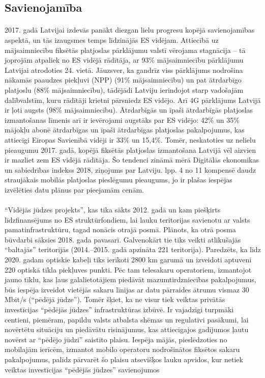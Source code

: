 \subsection{Savienojamība}
\paragraph{}
2017. gadā Latvijai izdevās panākt diezgan lielu progresu kopējā savienojamības
aspektā, un tās izaugsmes temps līdzinājās ES vidējam. Attiecībā uz mājsaimniecību
fiksētās platjoslas pārklājumu valstī vērojama stagnācija – tā joprojām atpaliek no ES
vidējā rādītāja, ar 93\% mājsaimniecību pārklājumu Latvijai atrodoties 24. vietā.
Jāuzsver, ka gandrīz viss pārklājums nodrošina nākamās paaudzes piekļuvi (NPP)
(91\% mājsaimniecību) un pat ātrdarbīgo platjoslu (88\% mājsaimniecību), tādējādi
Latviju ierindojot starp vadošajām dalībvalstīm, kuru rādītāji krietni pārsniedz ES
vidējo. Arī 4G pārklājums Latvijā ir ļoti augsts (98\% mājsaimniecību). Ātrdarbīgās un
īpaši ātrdarbīgās platjoslas izmantošanas līmenis arī ir ievērojami augstāks par ES
vidējo: 42\% un 35\% mājokļu abonē ātrdarbīgas un īpaši ātrdarbīgas platjoslas
pakalpojumus, kas attiecīgi Eiropas Savienībā vidēji ir 33\% un 15,4\%. Tomēr,
neskatoties uz nelielu pieaugumu 2017. gadā, kopējā fiksētās platjoslas izmantošana
Latvijā vēl aizvien ir mazliet zem ES vidējā rādītāja. Šo tendenci zināmā mērā 
Digitālās ekonomikas un sabiedrības indekss 2018, ziņojums par Latviju. lpp. 4 no 11
kompensē daudz straujākais mobilās platjoslas pieslēgumu pieaugums, jo ir plašas
iespējas izvēlēties datu plānus par pieejamām cenām.
\paragraph{}
“Vidējās jūdzes projekts”, kas tika sākts 2012. gadā un kam piešķirts līdzfinansējums
no ES struktūrfondiem, lai lauku teritorijas savienotu ar valsts pamatinfrastruktūru,
tagad nonācis otrajā posmā. Plānots, ka otrā posma būvdarbi sāksies 2018. gada
pavasarī. Galvenokārt tie tiks veikti atlikušajās “baltajās” teritorijās (2014.–2015. gadā
apzināta 221 teritorija). Paredzēts, ka līdz 2020. gadam optiskie kabeļi tiks ierīkoti
2800 km garumā un izveidoti aptuveni 220 optiskā tīkla piekļuves punkti. Pēc tam
telesakaru operatoriem, izmantojot jauno tīklu, kas ļaus galalietotājiem piedāvāt
mazumtirdzniecības pakalpojumus, būs iespēja izveidot vietējās sakaru līnijas ar datu
pārraides ātrumu vismaz 30 Mbit/s (“pēdējā jūdze”). Tomēr šķiet, ka ne visur tiek
veiktas privātās investīcijas “pēdējās jūdzes” infrastruktūras izbūvē. Ir vajadzīgi
turpmāki centieni, piemēram, papildu valsts atbalsta shēmas un regulatīvi pasākumi,
lai novērtētu situāciju un piedāvātu risinājumus, kas attiecīgajos gadījumos ļautu
novērst ar “pēdējo jūdzi” saistīto plaisu. Iespēja mājās, pieslēdzoties no mobilajām
ierīcēm, izmantot mobilo operatoru nodrošinātos fiksētos sakaru pakalpojumus,
palīdz pārvarēt šo plaisu atsevišķos lauku apvidos, kur netiek veiktas investīcijas
“pēdējās jūdzes” savienojumos
